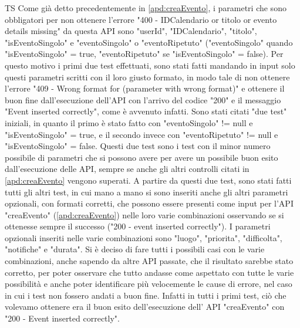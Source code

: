 \begin{listaPersonale}{TS}
                Come già detto precedentemente in \ref{apd:creaEvento}, i parametri che sono obbligatori per non ottenere l'errore "400 - IDCalendario or titolo or evento details missing" da questa API sono "userId", "IDCalendario", "titolo", "isEventoSingolo" e "eventoSingolo" o "eventoRipetuto" ("eventoSingolo" quando "isEventoSingolo" = true, "eventoRipetuto" se "isEventoSingolo" = false). Per questo motivo i primi due test effettuati, sono stati fatti mandando in input solo questi parametri scritti con il loro giusto formato, in modo tale di non ottenere l'errore "409 - Wrong format for (parameter with wrong format)" e ottenere il buon fine dall'esecuzione dell'API con l'arrivo del codice "200" e il messaggio "Event inserted correctly", come è avvenuto infatti. Sono stati citati "due test" iniziali, in quanto il primo è stato fatto con "eventoSingolo" != null e "isEventoSingolo" = true, e il secondo invece con "eventoRipetuto" != null e "isEventoSingolo" = false. Questi due test sono i test con il minor numero possibile di parametri che si possono avere per avere un possibile buon esito dall'esecuzione delle API, sempre se anche gli altri controlli citati in \ref{apd:creaEvento} vengono superati.
                A partire da questi due test, sono stati fatti tutti gli altri test, in cui mano a mano si sono inseriti anche gli altri parametri opzionali, con formati corretti, che possono essere presenti come input per l'API "creaEvento" (\ref{apd:creaEvento}) nelle loro varie combinazioni osservando se si ottenesse sempre il successo ("200 - event inserted correctly"). I parametri opzionali inseriti nelle varie combinazioni sono "luogo", "priorita", "difficolta", "notifiche" e "durata". Si è deciso di fare tutti i possibili casi con le varie combinazioni, anche sapendo da altre API passate, che il risultato sarebbe stato corretto, per poter osservare che tutto andasse come aspettato con tutte le varie possibilità e anche poter identificare più velocemente le cause di errore, nel caso in cui i test non fossero andati a buon fine. Infatti in tutti i primi test, ciò che volevamo ottenere era il buon esito dell'esecuzione dell' API "creaEvento" con "200 - Event inserted correctly". \\
                \begin{center}

\end{center}
\end{listaPersonale}
